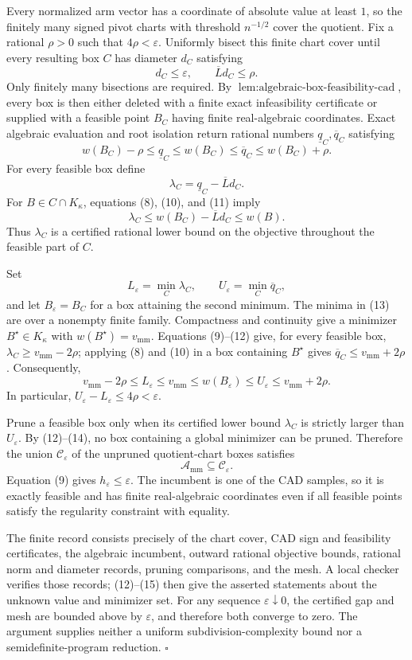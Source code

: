 Every normalized arm vector has a coordinate of absolute value at least \(1\), so the finitely many signed pivot charts with threshold \(n^{-1/2}\) cover the quotient.  Fix a rational \(\rho>0\) such that \(4\rho<\varepsilon\).  Uniformly bisect this finite chart cover until every resulting box \(C\) has diameter \(d_C\) satisfying
\[
d_C\le\varepsilon,
\qquad
\overline Ld_C\le\rho.
\tag{9}
\]
Only finitely many bisections are required.  By \(\operatorname{lem{:}algebraic\mbox{-}box\mbox{-}feasibility\mbox{-}cad}\), every box is then either deleted with a finite exact infeasibility certificate or supplied with a feasible point \(B_C\) having finite real-algebraic coordinates.  Exact algebraic evaluation and root isolation return rational numbers \(\underline q_C,\overline q_C\) satisfying
\[
w(B_C)-\rho\le\underline q_C\le w(B_C)
\le\overline q_C\le w(B_C)+\rho.
\tag{10}
\]
For every feasible box define
\[
\lambda_C=\underline q_C-\overline Ld_C.
\tag{11}
\]
For \(B\in C\cap K_\kappa\), equations (8), (10), and (11) imply
\[
\lambda_C
\le w(B_C)-\overline Ld_C
\le w(B).
\tag{12}
\]
Thus \(\lambda_C\) is a certified rational lower bound on the objective throughout the feasible part of \(C\).

Set
\[
L_\varepsilon=\min_C\lambda_C,
\qquad
U_\varepsilon=\min_C\overline q_C,
\tag{13}
\]
and let \(B_\varepsilon=B_C\) for a box attaining the second minimum.  The minima in (13) are over a nonempty finite family.  Compactness and continuity give a minimizer \(B^\star\in K_\kappa\) with \(w(B^\star)=v_{\mathrm{mm}}\).  Equations (9)--(12) give, for every feasible box, \(\lambda_C\ge v_{\mathrm{mm}}-2\rho\); applying (8) and (10) in a box containing \(B^\star\) gives \(\overline q_C\le v_{\mathrm{mm}}+2\rho\).  Consequently,
\[
v_{\mathrm{mm}}-2\rho
\le L_\varepsilon
\le v_{\mathrm{mm}}
\le w(B_\varepsilon)
\le U_\varepsilon
\le v_{\mathrm{mm}}+2\rho.
\tag{14}
\]
In particular, \(U_\varepsilon-L_\varepsilon\le4\rho<\varepsilon\).

Prune a feasible box only when its certified lower bound \(\lambda_C\) is strictly larger than \(U_\varepsilon\).  By (12)--(14), no box containing a global minimizer can be pruned.  Therefore the union \(\mathcal C_\varepsilon\) of the unpruned quotient-chart boxes satisfies
\[
\mathcal A_{\mathrm{mm}}\subseteq\mathcal C_\varepsilon.
\tag{15}
\]
Equation (9) gives \(h_\varepsilon\le\varepsilon\).  The incumbent is one of the CAD samples, so it is exactly feasible and has finite real-algebraic coordinates even if all feasible points satisfy the regularity constraint with equality.

The finite record consists precisely of the chart cover, CAD sign and feasibility certificates, the algebraic incumbent, outward rational objective bounds, rational norm and diameter records, pruning comparisons, and the mesh.  A local checker verifies those records; (12)--(15) then give the asserted statements about the unknown value and minimizer set.  For any sequence \(\varepsilon\downarrow0\), the certified gap and mesh are bounded above by \(\varepsilon\), and therefore both converge to zero.  The argument supplies neither a uniform subdivision-complexity bound nor a semidefinite-program reduction. \(\square\)
